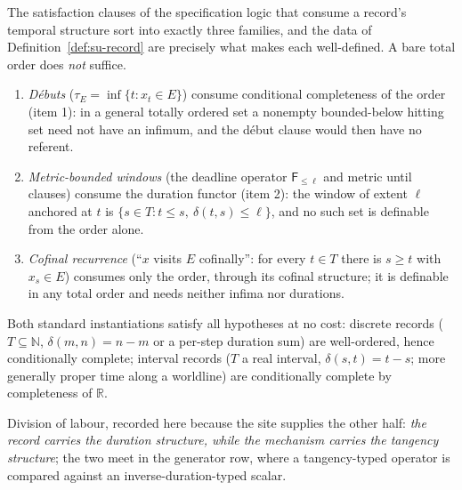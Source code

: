 \begin{remark}\label{rem:su-record-consumers}
The satisfaction clauses of the specification logic that consume a
record's temporal structure sort into exactly three families, and the
data of Definition~\ref{def:su-record} are precisely what makes each
well-defined. A bare total order does \emph{not} suffice.
\begin{enumerate}
\item \emph{D\'ebuts} ($\tau_E = \inf\{t : x_t \in E\}$) consume
  conditional completeness of the order (item 1): in a general totally
  ordered set a nonempty bounded-below hitting set need not have an
  infimum, and the d\'ebut clause would then have no referent.
\item \emph{Metric-bounded windows} (the deadline operator
  $\mathsf{F}_{\le \ell}$ and metric until clauses) consume the
  duration functor (item 2): the window of extent $\ell$ anchored at
  $t$ is $\{s \in T : t \le s,\ \delta(t,s) \le \ell\}$, and no such
  set is definable from the order alone.
\item \emph{Cofinal recurrence} (``$x$ visits $E$ cofinally'':
  for every $t \in T$ there is $s \ge t$ with $x_s \in E$) consumes
  only the order, through its cofinal structure; it is definable in
  any total order and needs neither infima nor durations.
\end{enumerate}
Both standard instantiations satisfy all hypotheses at no cost:
discrete records ($T \subseteq \mathbb{N}$, $\delta(m,n) = n - m$ or a
per-step duration sum) are well-ordered, hence conditionally complete;
interval records ($T$ a real interval, $\delta(s,t) = t - s$; more
generally proper time along a worldline) are conditionally complete by
completeness of $\mathbb{R}$.

Division of labour, recorded here because the site supplies
the other half: \emph{the record carries the duration structure, while
the mechanism carries the tangency structure}; the two meet in the
generator row, where a tangency-typed operator is compared against an
inverse-duration-typed scalar.
\end{remark}


